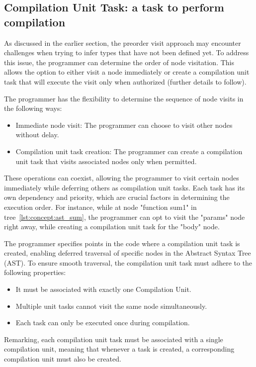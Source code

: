 \subsection{Compilation Unit Task: a task to perform compilation}\label{subsec:concept:CompilationUnitTaskATaskToPerformCompilation}

As discussed in the earlier section, the preorder visit approach may encounter challenges when trying to infer types that have not been defined yet. To address this issue, the programmer can determine the order of node visitation. This allows the option to either visit a node immediately or create a compilation unit task that will execute the visit only when authorized (further details to follow).

The programmer has the flexibility to determine the sequence of node visits in the following ways:
\begin{itemize}
    \item  Immediate node visit: The programmer can choose to visit other nodes without delay.
    \item Compilation unit task creation: The programmer can create a compilation unit task that visits associated nodes only when permitted.
\end{itemize}

These operations can coexist, allowing the programmer to visit certain nodes immediately while deferring others as compilation unit tasks. Each task has its own dependency and priority, which are crucial factors in determining the execution order. For instance, while at node "function sum1" in tree~\ref{lst:concept:ast_sum}, the programmer can opt to visit the "params" node right away, while creating a compilation unit task for the "body" node.

The programmer specifies points in the code where a compilation unit task is created, enabling deferred traversal of specific nodes in the Abstract Syntax Tree (AST). To ensure smooth traversal, the compilation unit task must adhere to the following properties:
\begin{itemize}
    \item It must be associated with exactly one Compilation Unit.
    \item Multiple unit tasks cannot visit the same node simultaneously.
    \item Each task can only be executed once during compilation.
\end{itemize}

Remarking, each compilation unit task must be associated with a single compilation unit, meaning that whenever a task is created, a corresponding compilation unit must also be created.

